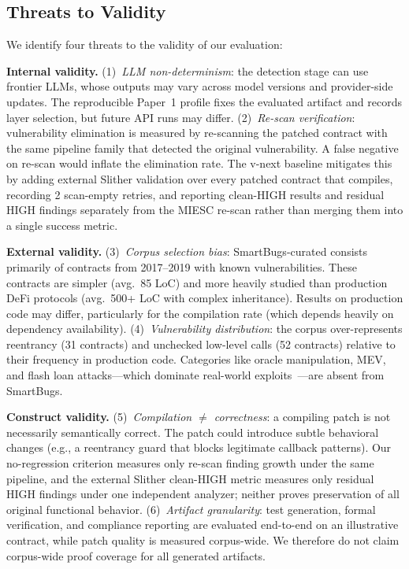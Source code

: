 \documentclass[conference]{IEEEtran}
\begin{document}
\subsection{Threats to Validity}
\label{sec:threats}

We identify four threats to the validity of our evaluation:

\textbf{Internal validity.} (1)~\emph{LLM non-determinism}: the detection stage can use frontier LLMs, whose outputs may vary across model versions and provider-side updates. The reproducible Paper~1 profile fixes the evaluated artifact and records layer selection, but future API runs may differ. (2)~\emph{Re-scan verification}: vulnerability elimination is measured by re-scanning the patched contract with the same pipeline family that detected the original vulnerability. A false negative on re-scan would inflate the elimination rate. The v-next baseline mitigates this by adding external Slither validation over every patched contract that compiles, recording 2 scan-empty retries, and reporting clean-HIGH results and residual HIGH findings separately from the MIESC re-scan rather than merging them into a single success metric.

\textbf{External validity.} (3)~\emph{Corpus selection bias}: SmartBugs-curated consists primarily of contracts from 2017--2019 with known vulnerabilities. These contracts are simpler (avg.\ 85 LoC) and more heavily studied than production DeFi protocols (avg.\ 500+ LoC with complex inheritance). Results on production code may differ, particularly for the compilation rate (which depends heavily on dependency availability). (4)~\emph{Vulnerability distribution}: the corpus over-represents reentrancy (31 contracts) and unchecked low-level calls (52 contracts) relative to their frequency in production code. Categories like oracle manipulation, MEV, and flash loan attacks---which dominate real-world exploits~\cite{atzei2017survey}---are absent from SmartBugs.

\textbf{Construct validity.} (5)~\emph{Compilation $\neq$ correctness}: a compiling patch is not necessarily semantically correct. The patch could introduce subtle behavioral changes (e.g., a reentrancy guard that blocks legitimate callback patterns). Our no-regression criterion measures only re-scan finding growth under the same pipeline, and the external Slither clean-HIGH metric measures only residual HIGH findings under one independent analyzer; neither proves preservation of all original functional behavior. (6)~\emph{Artifact granularity}: test generation, formal verification, and compliance reporting are evaluated end-to-end on an illustrative contract, while patch quality is measured corpus-wide. We therefore do not claim corpus-wide proof coverage for all generated artifacts.
\end{document}
